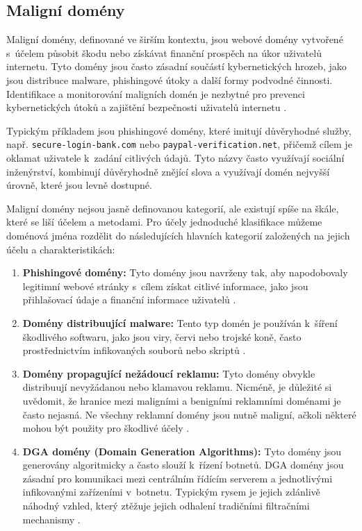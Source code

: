 \subsection{Maligní domény}
Maligní domény, definované ve širším kontextu, jsou webové domény vytvořené s~účelem působit škodu nebo získávat finanční prospěch na úkor uživatelů internetu. Tyto domény jsou často zásadní součástí kybernetických hrozeb, jako jsou distribuce malware, phishingové útoky a další formy podvodné činnosti. Identifikace a monitorování maligních domén je nezbytné pro prevenci kybernetických útoků a zajištění bezpečnosti uživatelů internetu \cite{antonakakis2017understanding}.

Typickým příkladem jsou phishingové domény, které imitují důvěryhodné služby, např. \texttt{secure-login-bank.com} nebo \texttt{paypal-verification.net}, přičemž cílem je oklamat uživatele k~zadání citlivých údajů. Tyto názvy často využívají sociální inženýrství, kombinují důvěryhodně znějící slova a využívají domén nejvyšší úrovně, které jsou levně dostupné.

Maligní domény nejsou jasně definovanou kategorií, ale existují spíše na škále, které se liší účelem a metodami. Pro účely jednoduché klasifikace můžeme doménová jména rozdělit do následujících hlavních kategorií založených na jejich účelu a charakteristikách:

\begin{enumerate}
    \item \textbf{Phishingové domény:} Tyto domény jsou navrženy tak, aby napodobovaly legitimní webové stránky s~cílem získat citlivé informace, jako jsou přihlašovací údaje a finanční informace uživatelů \cite{moore-clayton}.
    \item \textbf{Domény distribuující malware:} Tento typ domén je používán k~šíření škodlivého softwaru, jako jsou viry, červi nebo trojské koně, často prostřednictvím infikovaných souborů nebo skriptů \cite{provos2007virtual}.
    \item \textbf{Domény propagující nežádoucí reklamu:} Tyto domény obvykle distribuují nevyžádanou nebo klamavou reklamu. Nicméně, je důležité si uvědomit, že hranice mezi maligními a benigními reklamními doménami je často nejasná. Ne všechny reklamní domény jsou nutně maligní, ačkoli některé mohou být použity pro škodlivé účely \cite{thomas2015ad}.
    \item \textbf{DGA domény (Domain Generation Algorithms):} Tyto domény jsou generovány algoritmicky a často slouží k~řízení botnetů. DGA domény jsou zásadní pro komunikaci mezi centrálním řídícím serverem a jednotlivými infikovanými zařízeními v~botnetu. Typickým rysem je jejich zdánlivě náhodný vzhled, který ztěžuje jejich odhalení tradičními filtračními mechanismy \cite{plohmann2016comprehensive}. 
    
\end{enumerate}

